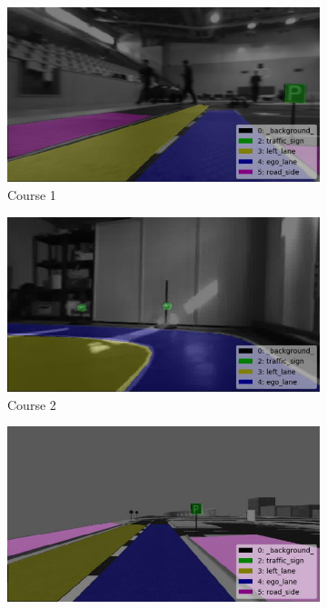 \begin{figure}[h]
  \centering
  \begin{subfigure}[b]{0.47\linewidth}
    \includegraphics[width=\linewidth]{figures/course1.jpg}
    \caption{Course 1}
  \end{subfigure}
  \begin{subfigure}[b]{0.47\linewidth}
    \includegraphics[width=\linewidth]{figures/course2.jpg}
    \caption{Course 2}
  \end{subfigure}
  \begin{subfigure}[b]{0.47\linewidth}
    \includegraphics[width=\linewidth]{figures/course3.jpg}

\end{subfigure}
\end{figure}
